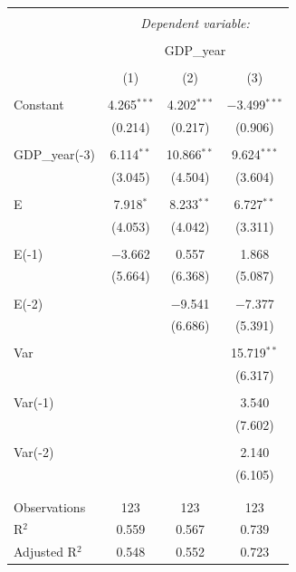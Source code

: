 \documentclass[12pt,a4paper,oneside]{book}
\begin{document}
\begin{table}[!htbp] \centering 
  \caption{} 
  \label{} 
\begin{tabular}{@{\extracolsep{5pt}}lccc} 
\\[-1.8ex]\hline 
\hline \\[-1.8ex] 
 & \multicolumn{3}{c}{\textit{Dependent variable:}} \\ 
\cline{2-4} 
\\[-1.8ex] & \multicolumn{3}{c}{GDP\_year} \\ 
\\[-1.8ex] & (1) & (2) & (3)\\ 
\hline \\[-1.8ex] 
 Constant & 4.265$^{***}$ & 4.202$^{***}$ & $-$3.499$^{***}$ \\ 
  & (0.214) & (0.217) & (0.906) \\ 
  & & & \\ 
  GDP\_year(-3) & 6.114$^{**}$ & 10.866$^{**}$ & 9.624$^{***}$ \\ 
  & (3.045) & (4.504) & (3.604) \\ 
  & & & \\ 
 E & 7.918$^{*}$ & 8.233$^{**}$ & 6.727$^{**}$ \\ 
  & (4.053) & (4.042) & (3.311) \\ 
  & & & \\ 
 E(-1) & $-$3.662 & 0.557 & 1.868 \\ 
  & (5.664) & (6.368) & (5.087) \\ 
  & & & \\ 
 E(-2) &  & $-$9.541 & $-$7.377 \\ 
  &  & (6.686) & (5.391) \\ 
  & & & \\ 
 Var &  &  & 15.719$^{**}$ \\ 
  &  &  & (6.317) \\ 
  & & & \\ 
 Var(-1) &  &  & 3.540 \\ 
  &  &  & (7.602) \\ 
  & & & \\ 
 Var(-2) &  &  & 2.140 \\ 
  &  &  & (6.105) \\ 
  & & & \\ 
\hline \\[-1.8ex] 
Observations & 123 & 123 & 123 \\ 
R$^{2}$ & 0.559 & 0.567 & 0.739 \\ 
Adjusted R$^{2}$ & 0.548 & 0.552 & 0.723 \\ 

\end{tabular}
\end{table}
\end{document}
